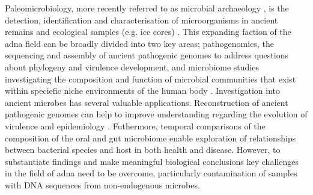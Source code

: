 \documentclass[12pt, a4paper]{article}
\begin{document}
Paleomicrobiology, more recently referred to as microbial archaeology \cite{Warinner:2017aa}, is the detection, identification and characterisation of microorganisms in ancient remains and ecological samples (e.g. ice cores) \cite{Drancourt:2005aa}. 
This expanding faction of the \gls{adna} field can be broadly divided into two key areas; \gls{pathogenomics}, the sequencing and assembly of ancient pathogenic genomes to address questions about phylogeny and virulence development, and \gls{microbiome} studies investigating the composition and function of microbial communities that exist within speciefic niche environments of the human body \cite{Lederberg:2001}.
Investigation into ancient microbes has several valuable applications.
Reconstruction of ancient pathogenic genomes can help to improve understanding regarding the evolution of virulence and epidemiology \cite{Bos:2011aa,Kay:2014aa}. 
Futhermore, temporal comparisons of the composition of the oral \cite{Adler:2013aa,Warinner:2014aa} and gut microbiome \cite{Tito:2012aa,Lugli:2017aa} enable exploration of relationships between bacterial species and host in both health and disease.
However, to substantiate findings and make meaningful biological conclusions key challenges in the field of \gls{adna} need to be overcome, particularly contamination of samples with DNA sequences from non-endogenous microbes. 
\end{document}
